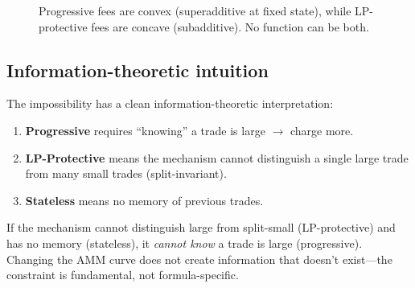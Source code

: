 \documentclass[11pt]{article}
\theoremstyle{definition}
\theoremstyle{remark}
\begin{document}
\begin{figure}[htbp]
\caption{Progressive fees are convex (superadditive at fixed state), while LP-protective fees are concave (subadditive). No function can be both.}
\label{fig:impossibility-geometry}
\end{figure}

\subsection{Information-theoretic intuition}

The impossibility has a clean information-theoretic interpretation:
\begin{enumerate}
\item \textbf{Progressive} requires ``knowing'' a trade is large $\rightarrow$ charge more.
\item \textbf{LP-Protective} means the mechanism cannot distinguish a single large trade from many small trades (split-invariant).
\item \textbf{Stateless} means no memory of previous trades.
\end{enumerate}
If the mechanism cannot distinguish large from split-small (LP-protective) and has no memory (stateless), it \emph{cannot know} a trade is large (progressive).
Changing the AMM curve does not create information that doesn't exist---the constraint is fundamental, not formula-specific.
\end{document}
